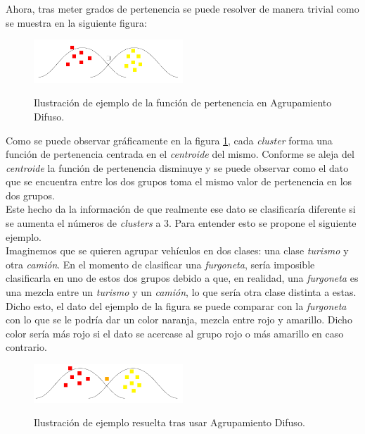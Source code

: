 \documentclass[]{report}
\begin{document}
				Ahora, tras meter grados de pertenencia se puede resolver de manera trivial como se muestra en la siguiente figura:
				
				\begin{figure}[h]
					\centering
					\includegraphics[width=0.5\textwidth]{clustering_difuso.jpg}
					\label{clustering_difuso}
					\caption{Ilustración de ejemplo de la función de pertenencia en Agrupamiento Difuso.}
				\end{figure}
			
				Como se puede observar gráficamente en la figura \ref{clustering_difuso}, cada \textit{cluster} forma una función de pertenencia centrada en el \textit{centroide} del mismo. Conforme se aleja del \textit{centroide} la función de pertenencia disminuye y se puede observar como el dato que se encuentra entre los dos grupos toma el mismo valor de pertenencia en los dos grupos.\\
				
				Este hecho da la información de que realmente ese dato se clasificaría diferente si se aumenta el números de \textit{clusters} a 3. Para entender esto se propone el siguiente ejemplo.\\
				
				Imaginemos que se quieren agrupar vehículos en dos clases: una clase \textit{turismo} y otra \textit{camión}. En el momento de clasificar una \textit{furgoneta}, sería imposible clasificarla en uno de estos dos grupos debido a que, en realidad, una \textit{furgoneta} es una mezcla entre un \textit{turismo} y un \textit{camión}, lo que sería otra clase distinta a estas.\\
				
				Dicho esto, el dato del ejemplo de la figura se puede comparar con la \textit{furgoneta} con lo que se le podría dar un color naranja, mezcla entre rojo y amarillo. Dicho color sería más rojo si el dato se acercase al grupo rojo o más amarillo en caso contrario.
				
				\begin{figure}[h]
					\centering
					\includegraphics[width=0.5\textwidth]{clustering_difuso_solucion.jpg}
					\label{clustering_difuso_solucion}
					\caption{Ilustración de ejemplo resuelta tras usar Agrupamiento Difuso.}
				\end{figure}
		
\end{document}
